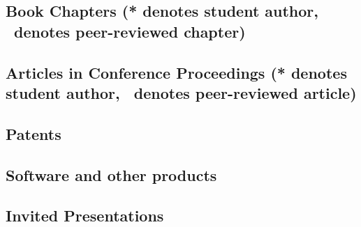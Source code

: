 \documentclass[10pt]{article}
\begin{document}
    \subsection[Book Chapters]{Book Chapters (* denotes student author, \peerrevmark\ denotes peer-reviewed chapter)}
    \begin{refsection}
        \nocite{*}
        \printbibliography[heading=none,type=incollection]
    \end{refsection}
  \subsection[Articles in Conference Proceedings]{Articles in Conference Proceedings (* denotes student author, \peerrevmark\ denotes peer-reviewed article)}
    \begin{refsection}
        \nocite{*}
        \printbibliography[heading=none,type=inproceedings]
    \end{refsection}
  \subsection{Patents}
    \begin{refsection}
        \nocite{*}
        \printbibliography[heading=none,type=patent]
       \end{refsection}
  \subsection{Software and other products}
  
  \subsection{Invited Presentations}
    \begin{enumerate}
    
    
    \end{enumerate}
  \iffalse
  \subsection{Published Abstracts}
    \begin{enumerate}
    
    
    \end{enumerate}
    \fi
\end{document}
